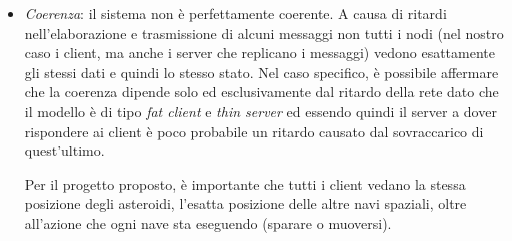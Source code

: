 \documentclass[paper=a4, fontsize=11pt]{scrartcl} %
\numberwithin{equation}{section} %
\numberwithin{figure}{section} %
\numberwithin{table}{section} %
\begin{document}
\begin{itemize}
\item \textit{Coerenza}: il sistema non è perfettamente coerente. A causa di ritardi nell'elaborazione e trasmissione di alcuni messaggi non tutti i nodi (nel nostro caso i client, ma anche i server che replicano i messaggi) vedono esattamente gli stessi dati e quindi lo stesso stato. Nel caso specifico, è possibile affermare che la coerenza dipende solo ed esclusivamente dal ritardo della rete dato che il modello è di tipo \textit{fat client} e \textit{thin server} ed essendo quindi il server a dover rispondere ai client è poco probabile un ritardo causato dal sovraccarico di quest'ultimo.

Per il progetto proposto, è importante che tutti i client vedano la stessa posizione degli asteroidi, l'esatta posizione delle altre navi spaziali, oltre all'azione che ogni nave sta eseguendo (sparare o muoversi).


\end{itemize}
\end{document}
